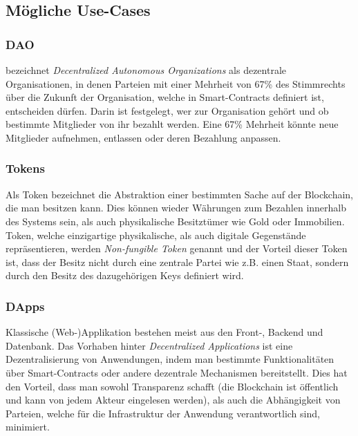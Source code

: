 \subsection{Mögliche Use-Cases}
\subsubsection{DAO}
\cite{buterin_whitepaper_2013} bezeichnet \emph{Decentralized Autonomous Organizations} als dezentrale Organisationen, in denen Parteien mit einer Mehrheit von 67\% des Stimmrechts über die Zukunft der Organisation, welche in Smart-Contracts definiert ist, entscheiden dürfen. Darin ist festgelegt, wer zur Organisation gehört und ob bestimmte Mitglieder von ihr bezahlt werden. Eine 67\% Mehrheit könnte neue Mitglieder aufnehmen, entlassen oder deren Bezahlung anpassen.
\subsubsection{Tokens}
Als Token bezeichnet \cite[S. 315]{antanopoulos_2018} die Abstraktion einer bestimmten Sache auf der Blockchain, die man besitzen kann. Dies können wieder Währungen zum Bezahlen innerhalb des Systems sein, als auch physikalische Besitztümer wie Gold oder Immobilien. Token, welche einzigartige physikalische, als auch digitale Gegenstände repräsentieren, werden \emph{Non-fungible Token} genannt und der Vorteil dieser Token ist, dass der Besitz nicht durch eine zentrale Partei wie z.B. einen Staat, sondern durch den Besitz des dazugehörigen Keys  definiert wird.
\subsubsection{DApps}
Klassische (Web-)Applikation bestehen meist aus den Front-, Backend und Datenbank. Das Vorhaben hinter \emph{Decentralized Applications} ist eine Dezentralisierung von Anwendungen, indem man bestimmte Funktionalitäten über Smart-Contracts oder andere dezentrale Mechanismen bereitstellt. Dies hat den Vorteil, dass man sowohl Transparenz schafft (die Blockchain ist öffentlich und kann von jedem Akteur eingelesen werden), als auch die Abhängigkeit von Parteien, welche für die Infrastruktur der Anwendung verantwortlich sind, minimiert.